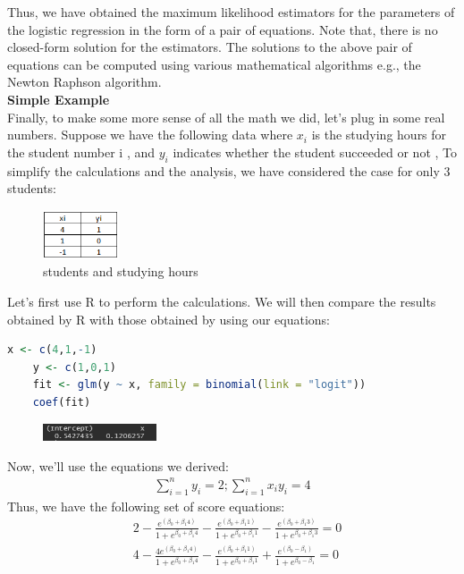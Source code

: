 Thus, we have obtained the maximum likelihood estimators for the parameters of the logistic regression in the form of a pair of equations. Note that, there is no closed-form solution for the estimators. The solutions to the above pair of equations can be computed using various mathematical algorithms e.g., the Newton Raphson algorithm.\\
\textbf{\Large Simple Example}\\
Finally, to make some more sense of all the math we did, let’s plug in some real numbers. Suppose we have the following data where $x_i$ is the studying hours for the student number i , and $ y_i $ indicates whether the student succeeded or not ,  To simplify the calculations and the analysis, we have considered the case for only 3 students:  
\begin{figure}[ht]
    \centering
    \includegraphics[width=0.2\textwidth]{assets/table1.png}
    \caption{ students and studying hours } 
\end{figure}
Let’s first use R to perform the calculations. We will then compare the results obtained by R with those obtained by using our equations:
\begin{lstlisting}[language=R]
    x <- c(4,1,-1)
    y <- c(1,0,1)
    fit <- glm(y ~ x, family = binomial(link = "logit"))
    coef(fit)
\end{lstlisting}
\begin{figure}[ht]
    \centering
    \includegraphics[width=0.3\textwidth]{assets/img1.png}
\end{figure}
Now, we’ll use the equations we derived:
\begin{align*}
    \sum_{i=1}^n y_i = 2 ; \sum_{i=1}^n x_i y_i = 4
\end{align*}
Thus, we have the following set of score equations:
\begin{align*}
    &2 - \frac{e^{(\beta_0+\beta_1 4)}}{1+e^{\beta_0+\beta_1 4}} - \frac{e^{(\beta_0+\beta_1 1)}}{1+e^{\beta_0+\beta_1 1}} - \frac{e^{(\beta_0+\beta_1 3)}}{1+e^{\beta_0+\beta_1 3}} = 0 \\
    &4 - \frac{4e^{(\beta_0+\beta_1 4)}}{1+e^{\beta_0+\beta_1 4}} - \frac{e^{(\beta_0+\beta_1 1)}}{1+e^{\beta_0+\beta_1 1}} + \frac{e^{(\beta_0-\beta_1 )}}{1+e^{\beta_0-\beta_1 }} = 0 
\end{align*}
